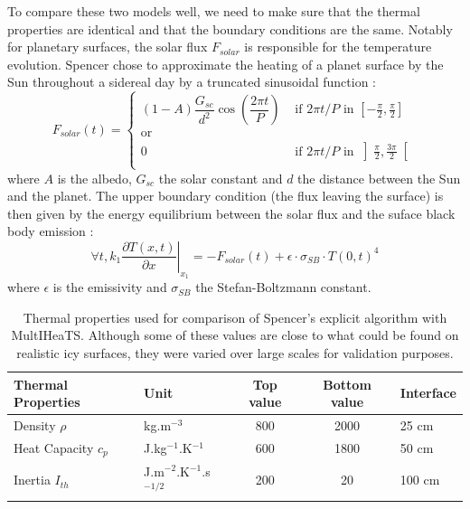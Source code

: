 \documentclass[]{interact}
\theoremstyle{plain}%
\theoremstyle{definition}
\theoremstyle{remark}
\begin{document}
To compare these two models well, we need to make sure that the thermal properties are identical and that the boundary conditions are the same.
Notably for planetary surfaces, the solar flux  $F_{solar}$ is responsible for the temperature evolution.
Spencer chose to approximate the heating of a planet surface by the Sun throughout a sidereal day by a truncated sinusoidal function :
\begin{equation}
	F_{solar}(t) = \left\{ 
		\begin{array}{ll}
			\left(1 - A \right) \dfrac{G_{sc}}{d^2} \cos \left(\dfrac{2 \pi t}{P} \right) & \text{ if } {2 \pi t}/{P} \text{ in } \left[-\frac{\pi}{2}, \frac{\pi}{2}\right] \\ 
		\text{or} \\
		0   &  \text{ if }  {2 \pi t}/{P} \text{ in } \left]\frac{\pi}{2}, \frac{3\pi}{2}\right[ \\
		\end{array}
	\right.
\end{equation}
where $A$ is the albedo, $G_{sc}$ the solar constant and $d$ the distance between the Sun and the planet. 
The upper boundary condition (the flux leaving the surface) is then given by the energy equilibrium between the solar flux and the suface black body emission :
\begin{equation}
    \forall t, k_1 \left. \dfrac{\partial T(x, t)}{\partial x}\right|_{x_1} =  - F_{solar}(t) + \epsilon \cdot \sigma_{SB} \cdot T(0, t)^4
\end{equation}
where $\epsilon$ is the emissivity and $\sigma_{SB}$ the Stefan-Boltzmann constant.

\begin{table}[htbp]
    \centering
    \begin{tabular}{ l l c c l } 
     \hline
     Thermal Properties & Unit & Top value & Bottom value & Interface \\ 
     \hline
     Density $\rho$ & kg.m$^{-3}$ & 800 & 2000 & 25 cm \\ 
    Heat Capacity $c_p$ & J.kg$^{-1}$.K$^{-1}$ & 600 & 1800 & 50 cm \\ 
    Inertia $I_{th}$ & J.m$^{-2}$.K$^{-1}$.s$^{-1/2}$ & 200 & 20 & 100 cm \\ 
     \hline
    \end{tabular}
\caption{Thermal properties used for comparison of Spencer's explicit algorithm with MultIHeaTS. Although some of these values are close to what could be found on realistic icy surfaces, they were varied over large scales for validation purposes.}
\label{tab:thermal_ppties}
\end{table}
\end{document}
